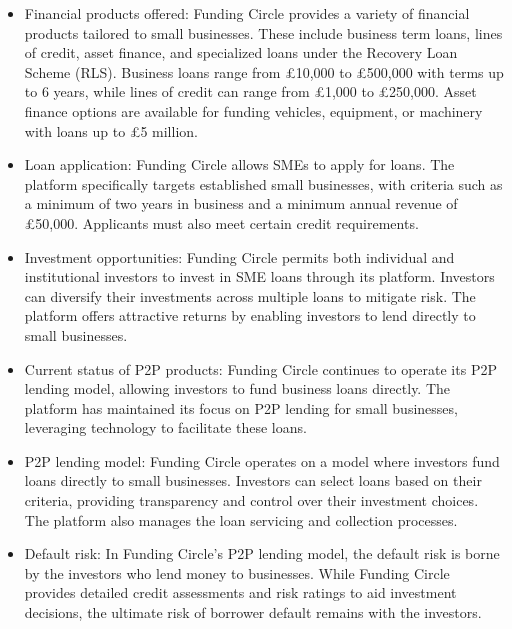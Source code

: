 \documentclass[pdflatex,sn-apa]{sn-jnl}%
\theoremstyle{thmstyleone}%
\theoremstyle{thmstyletwo}%
\theoremstyle{thmstylethree}%
\begin{document}
    \begin{itemize}
        \item Financial products offered: Funding Circle provides a variety of financial products tailored to small businesses. These include business term loans, lines of credit, asset finance, and specialized loans under the Recovery Loan Scheme (RLS). Business loans range from £10,000 to £500,000 with terms up to 6 years, while lines of credit can range from £1,000 to £250,000. Asset finance options are available for funding vehicles, equipment, or machinery with loans up to £5 million.
        
        \item Loan application: Funding Circle allows SMEs to apply for loans. The platform specifically targets established small businesses, with criteria such as a minimum of two years in business and a minimum annual revenue of £50,000. Applicants must also meet certain credit requirements.
        
        \item Investment opportunities: Funding Circle permits both individual and institutional investors to invest in SME loans through its platform. Investors can diversify their investments across multiple loans to mitigate risk. The platform offers attractive returns by enabling investors to lend directly to small businesses.
        
        \item Current status of P2P products: Funding Circle continues to operate its P2P lending model, allowing investors to fund business loans directly. The platform has maintained its focus on P2P lending for small businesses, leveraging technology to facilitate these loans.
        
        \item P2P lending model: Funding Circle operates on a model where investors fund loans directly to small businesses. Investors can select loans based on their criteria, providing transparency and control over their investment choices. The platform also manages the loan servicing and collection processes.
        
        \item Default risk: In Funding Circle’s P2P lending model, the default risk is borne by the investors who lend money to businesses. While Funding Circle provides detailed credit assessments and risk ratings to aid investment decisions, the ultimate risk of borrower default remains with the investors.
    \end{itemize}
\end{document}
